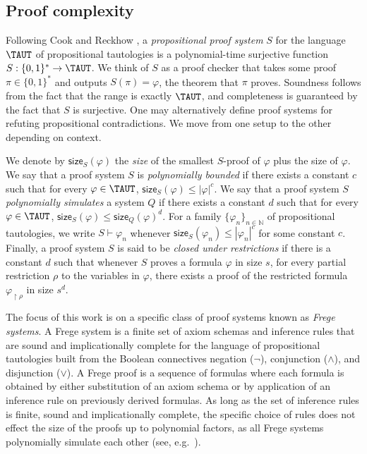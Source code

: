 \documentclass[11pt]{article}
\theoremstyle{definition}
\theoremstyle{plain}
\theoremstyle{remark}
\newcommand{\size}[2]{\mathsf{size}_{#1}(#2)}
\begin{document}
\subsection{Proof complexity}
\label{subsec:proof-complexity}
Following Cook and Reckhow \cite{cookReckhow}, a \emph{propositional proof system} $S$ for the language $\TAUT$ of propositional tautologies is a polynomial-time surjective function $S : \{0,1\}^* \to \TAUT$. We think of $S$ as a proof checker that takes some proof $\pi\in \{0 ,1\}^*$ and outputs $S(\pi) = \varphi$, the theorem that $\pi$ proves. Soundness follows from the fact that the range is exactly $\TAUT$, and completeness is guaranteed by the fact that $S$ is surjective. One may alternatively define proof systems for refuting propositional contradictions. We move from one setup to the other depending on context.

We denote by $\size{S}{\varphi}$ the \emph{size} of the smallest $S$-proof of $\varphi$ plus the size of $\varphi$. We say that a proof system $S$ is \emph{polynomially bounded} if there exists a constant $c$ such that for every $\varphi \in \TAUT$, $\size{S}{\varphi} \leq |\varphi|^c$. We say that a proof system $S$ \emph{polynomially simulates} a system $Q$ if there exists a constant $d$ such that for every $\varphi \in \TAUT$, $\size{S}{\varphi} \leq \size{Q}{\varphi}^{d}$. For a family $\{ \varphi_n\}_{n\in\mathbb{N}}$ of propositional tautologies, we write $S \vdash \varphi_n$ whenever $\size{S}{\varphi_n} \leq |\varphi_n|^{c}$ for some constant $c$. Finally, a proof system $S$ is said to be \emph{closed under restrictions} if there is a constant $d$ such that whenever $S$ proves a formula $\varphi$ in size $s$, for every partial restriction $\rho$ to the variables in $\varphi$, there exists a proof of the restricted formula $\varphi_{\restriction\rho}$ in size $s^{d}$.

The focus of this work is on a specific class of proof systems known as  \emph{Frege systems}. A Frege system is a finite set of axiom schemas and inference rules that are sound and implicationally complete for the language of propositional tautologies built from the Boolean connectives negation ($\neg$), conjunction ($\land$), and disjunction ($\lor$). A Frege proof is a sequence of formulas where each formula is obtained by either substitution of an axiom schema or by application of an inference rule on previously derived formulas. As long as the set of inference rules is finite, sound and implicationally complete, the specific choice of rules does not effect the size of the proofs up to polynomial factors, as all Frege systems polynomially simulate each other (see, e.g.\ \autocite[Theorem 4.4.13]{krajicekBOOK}).
\end{document}
